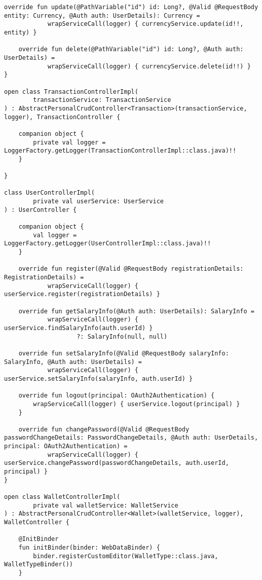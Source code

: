 \begin{lstlisting}[style = ktstyle]
    override fun update(@PathVariable("id") id: Long?, @Valid @RequestBody entity: Currency, @Auth auth: UserDetails): Currency =
            wrapServiceCall(logger) { currencyService.update(id!!, entity) }

    override fun delete(@PathVariable("id") id: Long?, @Auth auth: UserDetails) =
            wrapServiceCall(logger) { currencyService.delete(id!!) }
}

open class TransactionControllerImpl(
        transactionService: TransactionService
) : AbstractPersonalCrudController<Transaction>(transactionService, logger), TransactionController {

    companion object {
        private val logger = LoggerFactory.getLogger(TransactionControllerImpl::class.java)!!
    }

}

class UserControllerImpl(
        private val userService: UserService
) : UserController {

    companion object {
        val logger = LoggerFactory.getLogger(UserControllerImpl::class.java)!!
    }

    override fun register(@Valid @RequestBody registrationDetails: RegistrationDetails) =
            wrapServiceCall(logger) { userService.register(registrationDetails) }

    override fun getSalaryInfo(@Auth auth: UserDetails): SalaryInfo =
            wrapServiceCall(logger) { userService.findSalaryInfo(auth.userId) }
                    ?: SalaryInfo(null, null)

    override fun setSalaryInfo(@Valid @RequestBody salaryInfo: SalaryInfo, @Auth auth: UserDetails) =
            wrapServiceCall(logger) { userService.setSalaryInfo(salaryInfo, auth.userId) }

    override fun logout(principal: OAuth2Authentication) {
        wrapServiceCall(logger) { userService.logout(principal) }
    }

    override fun changePassword(@Valid @RequestBody passwordChangeDetails: PasswordChangeDetails, @Auth auth: UserDetails, principal: OAuth2Authentication) =
            wrapServiceCall(logger) { userService.changePassword(passwordChangeDetails, auth.userId, principal) }
}

open class WalletControllerImpl(
        private val walletService: WalletService
) : AbstractPersonalCrudController<Wallet>(walletService, logger), WalletController {

    @InitBinder
    fun initBinder(binder: WebDataBinder) {
        binder.registerCustomEditor(WalletType::class.java, WalletTypeBinder())
    }


\end{lstlisting}
